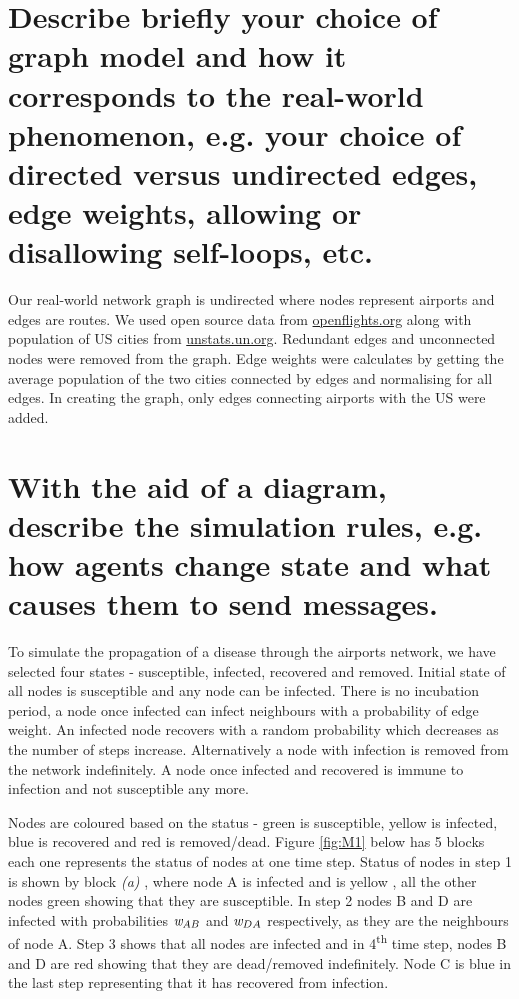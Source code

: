 \documentclass[a4paper,11pt]{article}
\begin{document}
\section{Describe briefly your choice of graph model and how it corresponds to the real-world phenomenon, e.g. your choice of directed versus undirected edges, edge weights, allowing or disallowing self-loops, etc.}

Our real-world network graph is undirected where nodes represent airports and edges are routes. We used open source data from \href{http://openflights.org}{openflights.org} along with population of US cities from \href{https://unstats.un.org/unsd/demographic/products/dyb/City_Page.htm}{unstats.un.org}. Redundant edges and unconnected nodes were removed from the graph. Edge weights were calculates by getting the average population of the two cities connected by edges and normalising for all edges. In creating the graph, only edges connecting airports with the US were added.



\section{With the aid of a diagram, describe the simulation rules, e.g. how agents change state and what causes them to send messages.}



To simulate the propagation of a disease through the airports network, we have selected four states - susceptible, infected, recovered and  removed. Initial state of all nodes is susceptible and any node can be infected. There is no incubation period, a node once infected can infect neighbours with a probability of edge weight. An infected node recovers with a random probability which decreases as the number of steps increase. Alternatively a node with infection is removed from the network indefinitely. A node once infected and recovered is immune to infection and not susceptible any more.

Nodes are coloured based on the status - green is susceptible, yellow is infected, blue is recovered and red is removed/dead. Figure \ref{fig:M1} below has 5 blocks each one represents the status of nodes at one time step. Status of nodes in step 1 is shown by block \textit{(a)} , where node A is infected and is yellow , all the other nodes green showing that they are susceptible. In step 2 nodes B and D are infected with probabilities ${\emph{w} _{AB}}$  and ${\emph{w}_{DA}}$ respectively, as they are the neighbours of node A. Step 3 shows that all nodes are infected and in 4\textsuperscript{th} time step, nodes B and D are red showing that they are dead/removed indefinitely. Node C is blue in the last step representing that it has recovered from infection.
\end{document}
